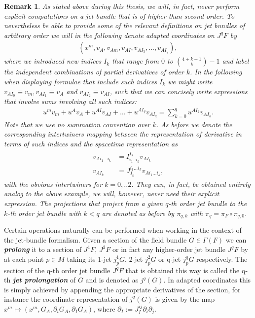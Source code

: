 \documentclass[a4paper,12pt, DIV=14, BCOR=5mm, twoside, headsepline, numbers=noenddot]{scrbook}
\newtheorem*{remark}{Remark}
\begin{document}
\begin{remark}
As stated above during this thesis, we will, in fact, never perform explicit computations on a jet bundle that is of higher than second-order. To nevertheless be able to provide some of the relevant definitions on jet bundles of arbitrary order we will in the following denote adapted coordinates on $J^qF$ by 
\begin{align}
(x^m,v_A,v_{Am},v_{AI},v_{AI_{3}},...,v_{AI_{q}}),
\end{align}
where we introduced new indices $I_k$ that range from $0$ to $\binom{4+k-1}{k}-1$ and label the independent combinations of partial derivatives of order $k$. In the following when displaying formulae that include such indices $I_k$ we might write $v_{AI_0} \equiv v_m, v_{AI_1} \equiv v_A$ and $v_{AI_2} \equiv v_{AI}$, such that we can concisely write expressions that involve sums involving all such indices:
\begin{align}
    u^mv_m + u^Av_A + u^{AI}v_{AI} + ... + u^{AI_q}v_{AI_q} = \sum _{k = 0}^q u^{AI_k}v_{AI_k}.
\end{align}
Note that we use no summation convention over $k$.
As before we denote the corresponding intertwiners mapping between the representation of derivative in terms of such indices and the spacetime representation as
\begin{align}
    \begin{aligned}
    v_{Ai_1...i_k} &= I^{I_k}_{i_1..i_k} v_{AI_k}\\
    v_{AI_k} &= J_{I_k}^{i_1...i_k} v_{Ai_1...i_k},
    \end{aligned}
\end{align}
with the obvious intertwiners for $k=0,..2$.
They can, in fact, be obtained entirely analog to the above example, we will, however, never need their explicit expression. 
The projections that project from a given $q$-th order jet bundle to the $k$-th order jet bundle with $k< q$ are denoted as before by $\pi_{q,k}$ with $\pi_q = \pi_F \circ \pi_{q,0}$.
\end{remark}

Certain operations naturally can be performed when working in the context of the jet-bundle formalism.
Given a section of the field bundle $G \in \Gamma(F)$ we can \textit{\textbf{prolong}} it to a section of $J^1F$, $J^2F$ or in fact any higher-order jet bundle $J^qF$ by at each point $p \in M$ taking its 1-jet $j^1_pG$, 2-jet $j^2_pG$ or  q-jet $j^q_pG$ respectively. The section of the q-th order jet bundle $J^qF$ that is obtained this way is called the q-th \textbf{\textit{jet prolongation}} of $G$ and is denoted as $j^q(G)$. In adapted coordinates this is simply achieved by appending the appropriate derivatives of the section, for instance the coordinate representation of $j^2(G)$ is given by the map $x^m \mapsto (x^m, G_A, \partial_i G_A, \partial_I G_A)$, where $\partial_I := J_I^{ij} \partial_i \partial_j$.
\end{document}
